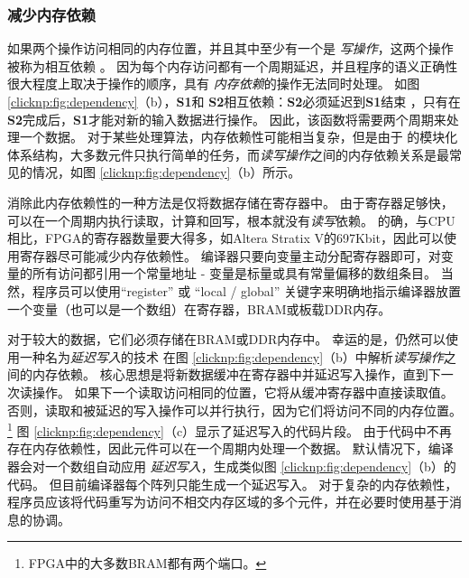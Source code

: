 \subsubsection{减少内存依赖}


如果两个操作访问相同的内存位置，并且其中至少有一个是 \textit {写操作}，这两个操作被称为相互依赖 \cite {dependence}。
因为每个内存访问都有一个周期延迟，并且程序的语义正确性很大程度上取决于操作的顺序，具有 \textit {内存依赖}的操作无法同时处理。
如图 \ref {clicknp:fig:dependency}（b），\textbf {S1}和 \textbf {S2}相互依赖：\textbf {S2}必须延迟到\textbf {S1}结束 ，只有在\textbf {S2}完成后，\textbf {S1}才能对新的输入数据进行操作。
因此，该函数将需要两个周期来处理一个数据。
对于某些处理算法，内存依赖性可能相当复杂，但是由于 \name 的模块化体系结构，大多数元件只执行简单的任务，而\textit {读写操作}之间的内存依赖关系是最常见的情况，如图 \ref{clicknp:fig:dependency}（b）所示。

消除此内存依赖性的一种方法是仅将数据存储在寄存器中。
由于寄存器足够快，可以在一个周期内执行读取，计算和回写，根本就没有\textit {读写}依赖。
的确，与CPU相比，FPGA的寄存器数量要大得多，如Altera Stratix V的697Kbit，因此可以使用寄存器尽可能减少内存依赖性。
\name 编译器只要向变量主动分配寄存器即可，对变量的所有访问都引用一个常量地址 - 变量是标量或具有常量偏移的数组条目。
当然，程序员可以使用``register'' 或 ``local / global'' 关键字来明确地指示编译器放置一个变量（也可以是一个数组）在寄存器，BRAM或板载DDR内存。

对于较大的数据，它们必须存储在BRAM或DDR内存中。
幸运的是，仍然可以使用一种名为\textit {延迟写入}的技术
在图 \ref {clicknp:fig:dependency}（b）中解析\textit {读写操作}之间的内存依赖。
核心思想是将新数据缓冲在寄存器中并延迟写入操作，直到下一次读操作。
如果下一个读取访问相同的位置，它将从缓冲寄存器中直接读取值。
否则，读取和被延迟的写入操作可以并行执行，因为它们将访问不同的内存位置。
\footnote{FPGA中的大多数BRAM都有两个端口。}
图 \ref {clicknp:fig:dependency}（c）显示了延迟写入的代码片段。
由于代码中不再存在内存依赖性，因此元件可以在一个周期内处理一个数据。
默认情况下，\name 编译器会对一个数组自动应用 \textit {延迟写入}，生成类似图 \ref {clicknp:fig:dependency}（b）的代码。
但目前编译器每个阵列只能生成一个延迟写入。
对于复杂的内存依赖性，程序员应该将代码重写为访问不相交内存区域的多个元件，并在必要时使用基于消息的协调。


